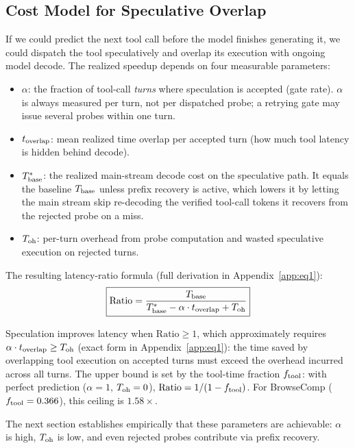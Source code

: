 \subsection{Cost Model for Speculative Overlap}
\label{sec:eq1}

If we could predict the next tool call before the model finishes generating it, we could
dispatch the tool speculatively and overlap its execution with ongoing model decode.
The realized speedup depends on four measurable parameters:
\begin{itemize}
  \item $\alpha$: the fraction of tool-call \emph{turns} where speculation is accepted
        (gate rate). $\alpha$ is always measured per turn, not per dispatched probe; a
        retrying gate may issue several probes within one turn.
  \item $t_{\mathrm{overlap}}$: mean realized time overlap per accepted turn (how much tool latency
        is hidden behind decode).
  \item $T_{\mathrm{base}}^{*}$: the realized main-stream decode cost on the speculative path. It
        equals the baseline $T_{\mathrm{base}}$ unless prefix recovery is active, which lowers it by
        letting the main stream skip re-decoding the verified tool-call tokens it recovers
        from the rejected probe on a miss.
  \item $T_{\mathrm{oh}}$: per-turn overhead from probe computation and wasted speculative execution
        on rejected turns.
\end{itemize}

\noindent The resulting latency-ratio formula (full derivation in Appendix~\ref{app:eq1}):
\begin{equation}
  \boxed{\mathrm{Ratio} = \frac{T_{\mathrm{base}}}{T_{\mathrm{base}}^{*} - \alpha\cdot t_{\mathrm{overlap}} + T_{\mathrm{oh}}}}
  \label{eq:eq1}
\end{equation}

\noindent Speculation improves latency when $\mathrm{Ratio} \geq 1$, which approximately
requires $\alpha\cdot t_{\mathrm{overlap}} \geq T_{\mathrm{oh}}$ (exact form in Appendix~\ref{app:eq1}): the time
saved by overlapping tool execution on accepted turns must exceed the overhead incurred
across all turns.
The upper bound is set by the tool-time fraction $f_{\mathrm{tool}}$: with perfect prediction
($\alpha=1$, $T_{\mathrm{oh}}=0$), $\mathrm{Ratio} = 1/(1-f_{\mathrm{tool}})$.
For BrowseComp ($f_{\mathrm{tool}}=0.366$), this ceiling is $1.58\times$.

The next section establishes empirically that these parameters are achievable: $\alpha$
is high, $T_{\mathrm{oh}}$ is low, and even rejected probes contribute via prefix recovery.
